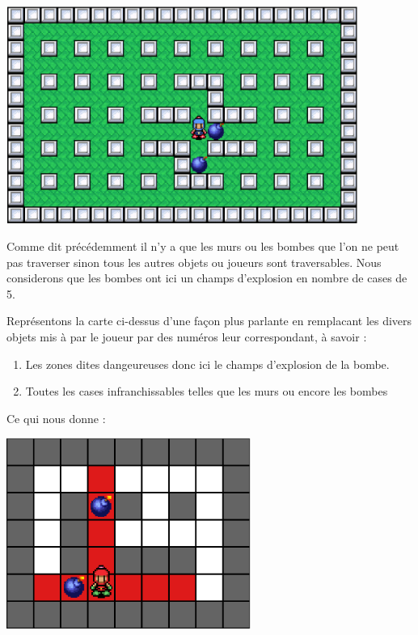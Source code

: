 			\begin{center}
				\includegraphics[width=115mm,height=71mm]{./Analyse/Img/fuite1.eps}
			\end{center}
			
			Comme dit précédemment il n'y a que les murs ou les bombes que l'on ne peut
			pas traverser sinon tous les autres objets ou joueurs sont traversables.
			Nous considerons que les bombes ont ici un champs d'explosion en nombre de
			cases de 5.			
			
			Représentons la carte ci-dessus d'une façon plus parlante en remplacant les
			divers objets mis à par le joueur par des numéros leur correspondant, à
			savoir :
			
			\begin{enumerate}
			  \item Les zones dites dangeureuses donc ici le champs d'explosion de la
			  bombe.
			  \item Toutes les cases infranchissables telles que les murs ou encore les
			  bombes
			\end{enumerate}
			
			Ce qui nous donne :
			
			\begin{center}
				\includegraphics[width=8cm]{./Analyse/Img/largeur_1.eps}
			\end{center}
			
